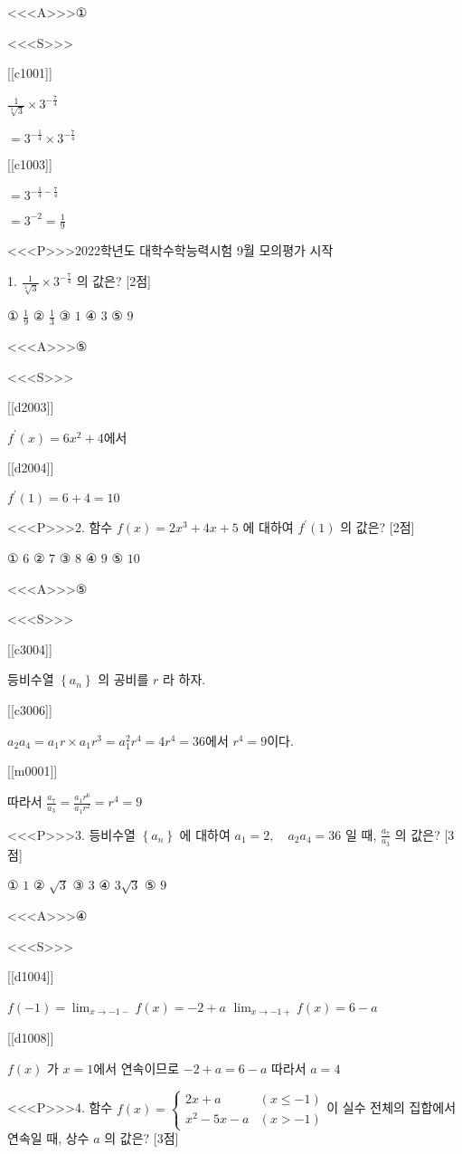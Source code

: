 \documentclass{oblivoir}
\begin{document}
<<<A>>>①

<<<S>>>

[[c1001]]

$\frac{1}{\sqrt[4]{3}} \times 3^{-\frac{7}{4}}$

$=3^{-\frac{1}{4}} \times 3^{-\frac{7}{4}}$

[[c1003]]

$=3^{-\frac{1}{4}-\frac{7}{4}}$

$=3^{-2}=\frac{1}{9}$

<<<P>>>2022학년도 대학수학능력시험 9월 모의평가 시작

1. $\frac{1}{\sqrt[4]{3}} \times 3^{-\frac{7}{4}}$ 의 값은? [2점]

① $\frac{1}{9}$
② $\frac{1}{3}$
③ $1$
④ $3$
⑤ $9$


<<<A>>>⑤

<<<S>>>

[[d2003]]

$ f^{\prime}(x)=6 x^{2}+4$에서

[[d2004]]

$f^{\prime}(1)=6+4=10$


<<<P>>>2. 함수 $f(x)=2 x^{3}+4 x+5$ 에 대하여 $f^{\prime}(1)$ 의 값은? [2점]

① $6$
② $7$
③ $8$
④ $9$
⑤ $10$

<<<A>>>⑤

<<<S>>>

[[c3004]]

등비수열 $\left\{a_{n}\right\}$ 의 공비를 $r$ 라 하자.

[[c3006]]

$a_{2} a_{4}=a_{1} r \times a_{1} r^{3}=a_{1}^{2} r^{4}=4 r^{4}=36$에서 $r^{4}=9$이다.

[[m0001]]

따라서 $\frac{a_{7}}{a_{3}}=\frac{a_{1} r^{6}}{a_{1} r^{2}}=r^{4}=9$


<<<P>>>3. 등비수열 $\left\{a_{n}\right\}$ 에 대하여 $a_{1}=2, \quad a_{2} a_{4}=36$ 일 때, $\frac{a_{7}}{a_{3}}$ 의 값은? [3점]

① $1$
② $\sqrt{3}$
③ $3$
④ $3 \sqrt{3}$
⑤ $9$

<<<A>>>④

<<<S>>>

[[d1004]]

$ f(-1)=\lim _{x \rightarrow-1-} f(x)=-2+a$
$\lim _{x \rightarrow-1+} f(x)=6-a$

[[d1008]]

$f(x)$ 가 $x=1$에서 연속이므로 $-2+a=6-a$
따라서 $a=4$


<<<P>>>4. 함수 $f(x)= \begin{cases}2 x+a & (x \leq-1) \\ x^{2}-5 x-a & (x>-1)\end{cases}$이 실수 전체의 집합에서 연속일 때, 상수 $a$ 의 값은? [3점]
\end{document}
